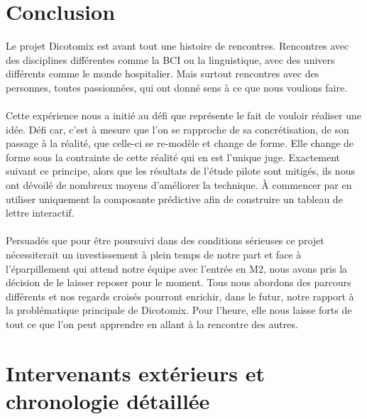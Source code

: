 \documentclass[11pt,a4paper]{article}
\theoremstyle{plain}
\theoremstyle{definition}
\begin{document}
\section{Conclusion}

Le projet Dicotomix est avant tout une histoire de rencontres. Rencontres avec des disciplines différentes comme la BCI ou la linguistique, avec des univers différents comme le monde hospitalier. 
Mais surtout rencontres avec des personnes, toutes passionnées, qui ont donné sens à ce que nous voulions faire. 
\paragraph{}Cette expérience nous a initié au défi que représente le fait de vouloir réaliser une idée. Défi car, 
c'est à mesure que l'on se rapproche de sa concrétisation, de son passage à la réalité, que celle-ci se re-modèle et change de forme. Elle change de forme sous la contrainte de cette réalité
qui en est l'unique juge. Exactement suivant ce principe, alors que les résultats de l'étude pilote sont mitigés, ils nous ont dévoilé de nombreux moyens d'améliorer la technique. À commencer par en utiliser
uniquement la composante prédictive afin de construire un tableau de lettre interactif.
\paragraph{}Persuadés que pour être poursuivi dans des conditions sérieuses ce projet nécessiterait un investissement à plein temps de notre part et face à l'éparpillement qui attend notre équipe avec l'entrée 
en M2, nous avons pris la décision de le laisser reposer pour le moment. Tous nous abordons des parcours différents et nos regards croisés pourront enrichir, dans le futur, notre rapport 
à la problématique principale de Dicotomix. Pour l'heure, elle nous laisse forts de tout ce que l'on peut apprendre en allant à la rencontre des autres.

\newpage
\appendix
\section{Intervenants extérieurs et chronologie détaillée}
\end{document}
